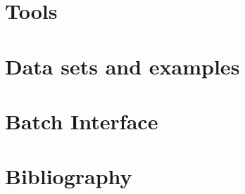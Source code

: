 \documentclass[a4paper,titlepage]{book}
\begin{document}

\part{Tools}









\part{Data sets and examples}





















\part{Batch Interface}






\part{Bibliography}


\end{document}
